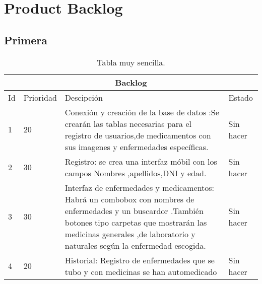 \chapter{Product Backlog}

\section{Primera}

\begin{table}[htb]
	\centering
	\begin{tabular}{|p{0.80cm}|l|p{10cm}|l|}
		\hline
		\multicolumn{4}{|c|}{Backlog} \\ \hline
		Id & Prioridad & Descipción & Estado \\
		\hline \hline
		1 & 20 &  Conexión y creación de la base de datos :Se crearán  las tablas necesarias para el registro de usuarios,de medicamentos con sus imagenes y enfermedades específicas. & Sin hacer \\ \hline
		2 & 30 & Registro: se crea una interfaz móbil con los campos Nombres ,apellidos,DNI y edad. & Sin hacer \\ \hline
		3 & 30 & Interfaz de enfermedades y medicamentos: Habrá un combobox con nombres de enfermedades y un buscardor .También  botones tipo carpetas que mostrarán las medicinas generales ,de laboratorio y naturales según la enfermedad escogida. & Sin hacer \\ \hline
		4 & 20 & Historial: Registro de enfermedades que se tubo y con medicinas se han automedicado & Sin hacer \\ \hline
	\end{tabular}
	\caption{Tabla muy sencilla.}
	\label{tabla:sencilla2}
\end{table}
